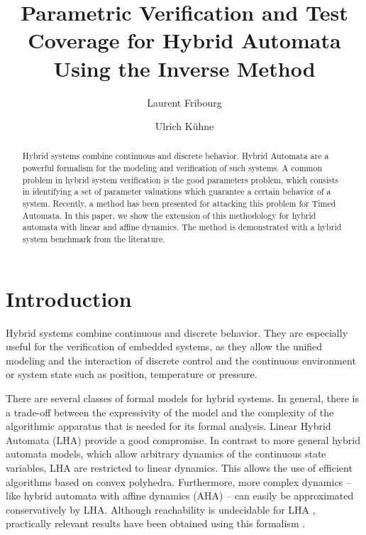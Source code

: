 \documentclass{llncs}
\begin{document}
\title{Parametric Verification and Test Coverage for Hybrid Automata
  Using the Inverse Method}

\author{Laurent Fribourg \and Ulrich K\"uhne}



\maketitle

\begin{abstract}
  Hybrid systems combine continuous and discrete behavior.  Hybrid
  Automata are a powerful formalism for the modeling and verification
  of such systems. A common problem in hybrid system verification is
  the good parameters problem, which consists in identifying a set of
  parameter valuations which guarantee a certain behavior of a
  system. Recently, a method has been presented for attacking this
  problem for Timed Automata. In this paper, we show the extension of
  this methodology for hybrid automata with linear and affine
  dynamics. The method is demonstrated with a hybrid system benchmark
  from the literature.
\end{abstract}


\section{Introduction} \label{sec:intro}

Hybrid systems combine continuous and discrete behavior. They are
especially useful for the verification of embedded systems, as they
allow the unified modeling and the interaction of discrete control and
the continuous environment or system state such as position,
temperature or pressure. 

There are several classes of formal models for hybrid systems. In
general, there is a trade-off between the expressivity of the model
and the complexity of the algorithmic apparatus that is needed for its
formal analysis. Linear Hybrid Automata (LHA) provide a good
compromise. In contrast to more general hybrid automata models, which
allow arbitrary dynamics of the continuous state variables, LHA are
restricted to linear dynamics. This allows the use of efficient
algorithms based on convex polyhedra. Furthermore, more complex
dynamics -- like hybrid automata with affine dynamics (AHA) -- can
easily be approximated conservatively by LHA.  Although reachability
is undecidable for LHA \cite{HKPV:95}, practically relevant results
have been obtained using this formalism \cite{HHW:97}.
\end{document}
